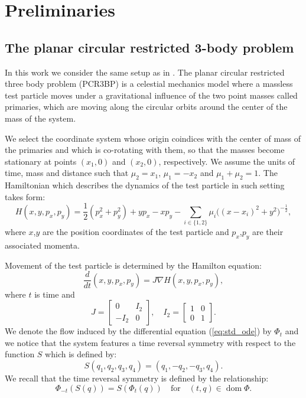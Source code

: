 \documentclass[1p]{article}
\DeclareMathOperator{\dom}{dom}
\begin{document}
\section{Preliminaries}
\label{sec:preliminaries}
\subsection{The planar circular restricted 3-body problem\label{subsec:PCR3BP}}
In this work we consider the same setup as in \cite{CAPINSKI2026109173}. The planar circular restricted three body problem (PCR3BP) is a celestial mechanics model where a massless test particle moves under a gravitational influence of the two point masses called primaries, which are moving along the circular orbits around the center of the mass of the system. 

We select the coordinate system whose origin coindices with the center of mass of the primaries and which is co-rotating with them, so that the masses become stationary at points $(x_1, 0)$ and $(x_2, 0)$, respectively. We assume the units of time, mass and distance such that $\mu_2  = x_1$, $\mu_1 = -x_2$ and $\mu_1 + \mu_2 = 1$. The Hamiltonian which describes the dynamics of the test particle in such setting takes form:
\begin{equation}
    H(x,y,p_{x},p_{y})=\frac{1}{2}(p_{x}^{2}+p_{y}^{2})+yp_{x}-xp_{y}-\sum_{i\in\{1,2\}}\mu_{i}\big((x-x_{i})^{2}+y^{2}\big)^{-\frac{1}{2}},
\end{equation}
where $x$,$y$ are the position coordinates of the test particle and $p_{x}$,$p_{y}$ are their associated momenta.

Movement of the test particle is determined by the Hamilton equation:
\begin{equation}
    \label{eq:std_ode}
    \frac{d}{dt}(x,y,p_{x},p_{y})=J\nabla H(x,y,p_{x},p_{y}),
\end{equation}
where $t$ is time and 
\begin{equation}
    \label{eq:J_matrix_def}
    J=\begin{bmatrix}0 & I_{2}\\-I_{2} & 0 \end{bmatrix},\quad
    I_{2}=\begin{bmatrix}1 & 0\\0 & 1\end{bmatrix}.
\end{equation}
We denote the flow induced by the differential equation (\ref{eq:std_ode}) by $\Phi_t$ and we notice that the system features a time reversal symmetry with respect to the function $S$ which is defined by:
\begin{equation}
    \label{eq:S_symmetry}
    S(q_1, q_2, q_3, q_4) = (q_1, -q_2, -q_3, q_4).
\end{equation}
We recall that the time reversal symmetry is defined by the relationship:
\[
    \Phi_{-t} (S(q)) = S( \Phi_t (q) ) \quad\text{for}\quad (t,q) \in \dom \Phi.
\]
\end{document}
